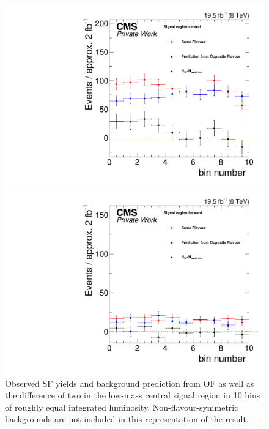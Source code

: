 \begin{figure}[htbp]
\centering
\begin{minipage}[t]{0.49\textwidth}
  \includegraphics[width=\textwidth]{plots/results/YieldvsLumi_Bins_SignalCentral_Mll_edgeMassFull2012.pdf}
\end{minipage}
\begin{minipage}[t]{0.49\textwidth}
\includegraphics[width=\textwidth]{plots/results/YieldvsLumi_Bins_SignalForward_Mll_edgeMassFull2012.pdf}
\end{minipage}

\caption{Observed SF yields and background prediction from OF as well as the difference of two in the low-mass central signal region in 10 bins of roughly equal integrated luminosity. Non-flavour-symmetric backgrounds are not included in this representation of the result.}
\label{fig:timeDependece}
\end{figure}


